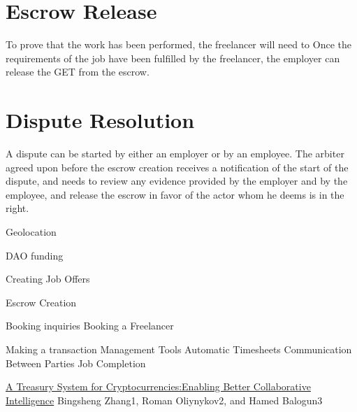 \documentclass{article}
\begin{document}
\section{Escrow Release}
To prove that the work has been performed, the freelancer will need to Once the requirements of the job have been fulfilled by the freelancer, the employer can release the GET from the escrow.

\section{Dispute Resolution}
A dispute can be started by either an employer or by an employee. The arbiter agreed upon before the escrow creation receives a notification of the start of the dispute, and needs to review any evidence provided by the employer and by the employee, and release the escrow in favor of the actor whom he deems is in the right.

Geolocation

DAO funding


Creating Job Offers



Escrow Creation

Booking inquiries
Booking a Freelancer

Making a transaction
Management Tools
Automatic Timesheets
Communication Between Parties
Job Completion


\begin{thebibliography}{99}

\href{https://www.lancaster.ac.uk/staff/zhangb2/treasury.pdf}{A Treasury System for Cryptocurrencies:Enabling Better Collaborative Intelligence}
Bingsheng Zhang1, Roman Oliynykov2, and Hamed Balogun3

\end{thebibliography}
\end{document}
